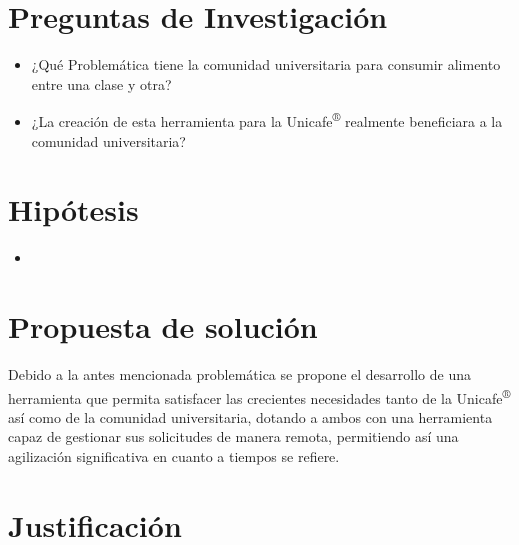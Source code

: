 \begin{large}
\section{Preguntas de Investigación}
\begin{itemize}
    \item ¿Qué Problemática tiene la comunidad universitaria para consumir alimento entre una clase y otra?
    \item ¿La creación de esta herramienta para la Unicafe\textsuperscript{®} realmente beneficiara a la comunidad universitaria?
\end{itemize}\leavevmode

\section{Hipótesis}
\begin{itemize}

    \item 
\end{itemize}\leavevmode

\section{Propuesta de solución}

Debido a la antes mencionada problemática se propone el desarrollo de una herramienta que permita satisfacer las crecientes necesidades tanto de la Unicafe\textsuperscript{®} así como de la comunidad universitaria, dotando a ambos con una herramienta capaz de gestionar sus solicitudes de manera remota, permitiendo así una agilización significativa en cuanto a tiempos se refiere.

\section{Justificación}


\end{large}
